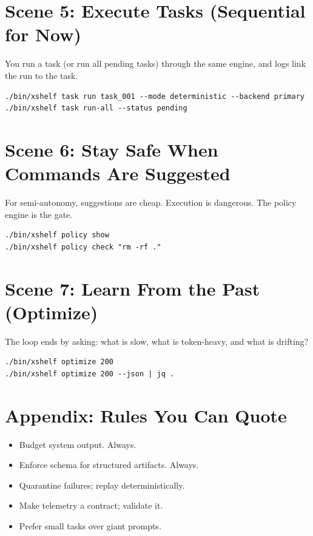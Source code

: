 \documentclass[11pt]{article}
\begin{document}
\section{Scene 5: Execute Tasks (Sequential for Now)}
You run a task (or run all pending tasks) through the same engine, and logs link the run to the task.

\begin{lstlisting}[style=cx]
./bin/xshelf task run task_001 --mode deterministic --backend primary
./bin/xshelf task run-all --status pending
\end{lstlisting}

\section{Scene 6: Stay Safe When Commands Are Suggested}
For semi-autonomy, suggestions are cheap. Execution is dangerous. The policy engine is the gate.

\begin{lstlisting}[style=cx]
./bin/xshelf policy show
./bin/xshelf policy check "rm -rf ."
\end{lstlisting}

\section{Scene 7: Learn From the Past (Optimize)}
The loop ends by asking: what is slow, what is token-heavy, and what is drifting?

\begin{lstlisting}[style=cx]
./bin/xshelf optimize 200
./bin/xshelf optimize 200 --json | jq .
\end{lstlisting}

\section{Appendix: Rules You Can Quote}
\begin{itemize}
  \item Budget system output. Always.
  \item Enforce schema for structured artifacts. Always.
  \item Quarantine failures; replay deterministically.
  \item Make telemetry a contract; validate it.
  \item Prefer small tasks over giant prompts.
\end{itemize}
\end{document}
